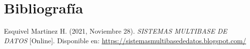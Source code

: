 \section{Bibliografía}

\begin{biblio}
	\item Esquivel Martinez H. (2021, Noviembre 28). \textit{SISTEMAS MULTIBASE DE DATOS} [Online]. Disponible en: \newline \textcolor{blue}{\underline{\url{https://sistemasmultibasededatos.blogspot.com/}}}
\end{biblio}